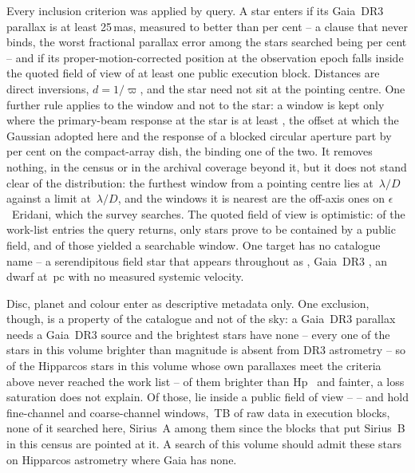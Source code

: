Every inclusion criterion was applied by query. A star enters if its Gaia~DR3
parallax is at least 25\,mas, measured to better than \PlxAdqlPct{} per cent --
a clause that never binds, the worst fractional parallax error among the stars
searched being \SfPlxWorstPct{} per cent -- and if its proper-motion-corrected
position at the observation epoch falls inside the quoted field of view of at
least one public execution block. Distances are direct inversions,
$d=1/\varpi$, and the star need not sit at the pointing centre. One further
rule applies to the window and not to the star: a window is kept only where the
primary-beam response at the star is at least \BmFloorResp, the offset at which
the Gaussian adopted here and the response of a blocked circular aperture part
by \BmFloorTolPct{} per cent on the compact-array dish, the binding one of the
two. It removes nothing, in the census or in the archival coverage beyond it,
but it does not stand clear of the distribution: the furthest window from a
pointing centre lies at \ExCWorstExt\,$\lambda/D$ against a limit at
\BmFloorC\,$\lambda/D$, and the windows it is nearest are the off-axis ones on
$\epsilon$~Eridani, which the survey searches. The quoted field of view is
optimistic: of the \NCensus{} work-list entries the query returns, only
\NGenuinelyCovered{} stars prove to be contained by a public field, and
\NStars{} of those yielded a searchable window. One target has no catalogue
name -- a serendipitous field star that appears throughout as \BkAlmaName,
Gaia~DR3 \BkAlmaGaia, an \BkAlmaSpType{} dwarf at \BkAlmaDistPc\,pc with no
measured systemic velocity.

Disc, planet and colour enter as descriptive metadata only. One exclusion,
though, is a property of the catalogue and not of the sky: a Gaia~DR3 parallax
needs a Gaia~DR3 source and the brightest stars have none -- every one of the
\BsNBright{} stars in this volume brighter than \BsBrightMag{} magnitude is
absent from DR3 astrometry -- so \BsNGap{} of the
\BsNVol{} Hipparcos stars in this volume whose own parallaxes meet the criteria
above never reached the work list -- \BsGapNBright{} of them brighter than
Hp~\BsGapMagCut{} and \BsGapNFaint{} fainter, a loss saturation does not
explain. Of those, \BsNAlmaWord{} lie inside a public field of view --
\BsStarList{} -- and hold \BsNWinA{} fine-channel and \BsNWinB{} coarse-channel
windows, \BsRawTB\,TB of raw data in \BsNEB{} execution blocks, none of it
searched here, Sirius~A among them since the \BsSirNEBWord{} blocks that put
Sirius~B in this census are pointed at it. A search of this volume should admit
these stars on Hipparcos astrometry where Gaia has none.


